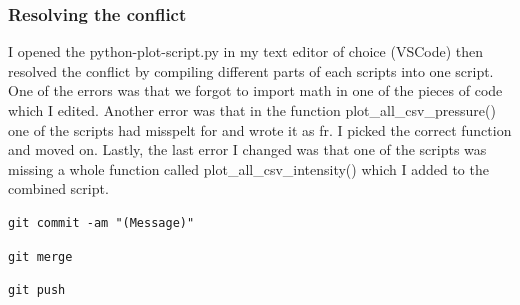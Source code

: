 \documentclass[]{article}
\begin{document}
\subsubsection{Resolving the conflict}
I opened the python-plot-script.py in my text editor of choice (VSCode) then resolved the conflict by compiling different
parts of each scripts into one script. One of the errors was that we forgot to import math in one of the pieces of code
which I edited. Another error was that in the function plot\_all\_csv\_pressure() one of the scripts had misspelt for and
wrote it as fr. I picked the correct function and moved on. Lastly, the last error I changed was that one of the scripts
was missing a whole function called plot\_all\_csv\_intensity() which I added to the combined script.
\begin{tcolorbox}[colback=white, colframe=black, boxrule=0.5pt, arc=2mm, 
    title=Git Add, fonttitle=\bfseries, listing only, listing options={language=sh, basicstyle=\ttfamily}]
\begin{verbatim}
git commit -am "(Message)"
\end{verbatim}
\end{tcolorbox}

\begin{tcolorbox}[colback=white, colframe=black, boxrule=0.5pt, arc=2mm, 
    title=Git Merge, fonttitle=\bfseries, listing only, listing options={language=sh, basicstyle=\ttfamily}]
\begin{verbatim}
git merge
\end{verbatim}
\end{tcolorbox}

\begin{tcolorbox}[colback=white, colframe=black, boxrule=0.5pt, arc=2mm, 
    title=Git Push, fonttitle=\bfseries, listing only, listing options={language=sh, basicstyle=\ttfamily}]
\begin{verbatim}
git push
\end{verbatim}
\end{tcolorbox}
\end{document}
